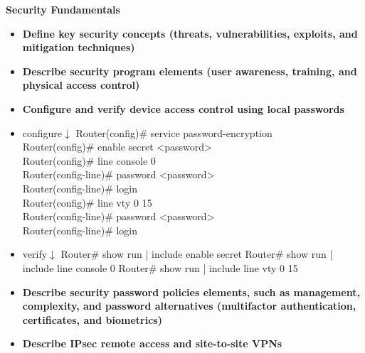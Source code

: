 \documentclass{article}
\begin{document}
\begin{flushleft}\textbf{Security Fundamentals}\end{flushleft}
\begin{itemize}
  \item \textbf{Define key security concepts (threats, vulnerabilities, exploits, and mitigation techniques)}
  
  \item \textbf{Describe security program elements (user awareness, training, and physical access control)}
  
  \item \textbf{Configure and verify device access control using local passwords}
  	\item[] configure$\downarrow$
  		Router(config)\# service password-encryption\\
  		
  		Router(config)\# enable secret \textless password\textgreater\\
  		
  		Router(config)\# line console 0\\
  		Router(config-line)\# password \textless password\textgreater\\
  		Router(config-line)\# login\\
  		
  		Router(config)\# line vty 0 15\\
  		Router(config-line)\# password \textless password\textgreater\\
  		Router(config-line)\# login
  	\item[] verify$\downarrow$
  		Router\# show run | include enable secret
  		Router\# show run | include line console 0
  		Router\# show run | include line vty 0 15
  \item \textbf{Describe security password policies elements, such as management, complexity, and password alternatives (multifactor authentication, certificates, and biometrics)}
  
  \item \textbf{Describe IPsec remote access and site-to-site VPNs}
  

\end{itemize}
\end{document}
